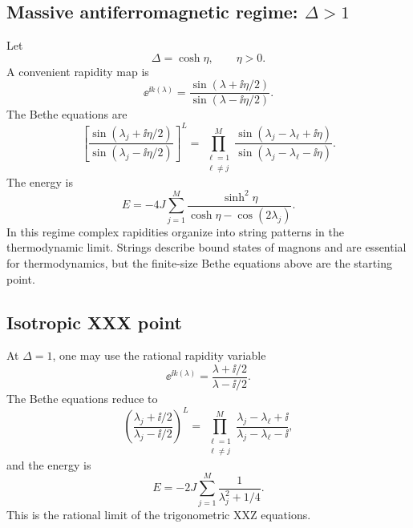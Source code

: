 \subsection*{Massive antiferromagnetic regime: $\Delta>1$}

Let
\begin{equation}
\label{eq:cba-massive-parametrization}
    \Delta=\cosh\eta,
    \qquad
    \eta>0 .
\end{equation}
A convenient rapidity map is
\begin{equation}
\label{eq:cba-massive-momentum-rapidity-map}
    \ee^{\ii k(\lambda)}
    =
    \frac{\sin(\lambda+\ii\eta/2)}
         {\sin(\lambda-\ii\eta/2)} .
\end{equation}
The Bethe equations are
\begin{equation}
\label{eq:cba-massive-xxz-bethe-equations}
    \left[
    \frac{\sin(\lambda_j+\ii\eta/2)}
         {\sin(\lambda_j-\ii\eta/2)}
    \right]^L
    =
    \prod_{\substack{\ell=1\\ \ell\neq j}}^{M}
    \frac{\sin(\lambda_j-\lambda_\ell+\ii\eta)}
         {\sin(\lambda_j-\lambda_\ell-\ii\eta)} .
\end{equation}
The energy is
\begin{equation}
\label{eq:cba-massive-energy-rapidity}
    E
    =
    -4J\sum_{j=1}^{M}
    \frac{\sinh^2\eta}{\cosh\eta-\cos(2\lambda_j)} .
\end{equation}
In this regime complex rapidities organize into string patterns in the
thermodynamic limit.  Strings describe bound states of magnons and are essential
for thermodynamics, but the finite-size Bethe equations above are the starting
point.

\subsection*{Isotropic XXX point}

At $\Delta=1$, one may use the rational rapidity variable
\begin{equation}
\label{eq:cba-xxx-momentum-rapidity-map}
    \ee^{\ii k(\lambda)}
    =
    \frac{\lambda+\ii/2}{\lambda-\ii/2} .
\end{equation}
The Bethe equations reduce to
\begin{equation}
\label{eq:cba-xxx-bethe-equations}
    \left(
    \frac{\lambda_j+\ii/2}{\lambda_j-\ii/2}
    \right)^L
    =
    \prod_{\substack{\ell=1\\ \ell\neq j}}^{M}
    \frac{\lambda_j-\lambda_\ell+\ii}
         {\lambda_j-\lambda_\ell-\ii} ,
\end{equation}
and the energy is
\begin{equation}
\label{eq:cba-xxx-energy}
    E
    =
    -2J\sum_{j=1}^{M}
    \frac{1}{\lambda_j^2+1/4} .
\end{equation}
This is the rational limit of the trigonometric XXZ equations.

